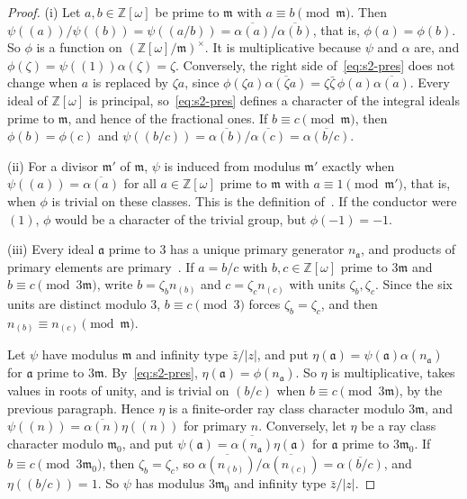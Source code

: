 \documentclass[11pt]{article}
\numberwithin{equation}{section}
\newcommand{\OO}{\mathbb Z[\omega]}
\begin{document}
\begin{proof}
(i) Let $a,b\in\OO$ be prime to $\mathfrak m$ with $a\equiv b\pmod{\mathfrak m}$. Then
$\psi((a))/\psi((b))=\psi((a/b))=\overline{\alpha(a)}/\overline{\alpha(b)}$, that is, $\phi(a)=\phi(b)$. So
$\phi$ is a function on $(\OO/\mathfrak m)^\times$. It is multiplicative because $\psi$ and $\alpha$ are, and
$\phi(\zeta)=\psi((1))\alpha(\zeta)=\zeta$. Conversely, the right side of~\eqref{eq:s2-pres} does not change
when $a$ is replaced by $\zeta a$, since $\phi(\zeta a)\overline{\alpha(\zeta a)}=\zeta\bar\zeta\,\phi(a)\overline{\alpha(a)}$.
Every ideal of $\OO$ is principal, so~\eqref{eq:s2-pres} defines a character of the integral ideals prime to
$\mathfrak m$, and hence of the fractional ones. If $b\equiv c\pmod{\mathfrak m}$, then $\phi(b)=\phi(c)$ and
$\psi((b/c))=\overline{\alpha(b)}/\overline{\alpha(c)}=\overline{\alpha(b/c)}$.

(ii) For a divisor $\mathfrak m'$ of $\mathfrak m$, $\psi$ is induced from modulus $\mathfrak m'$ exactly when
$\psi((a))=\overline{\alpha(a)}$ for all $a\in\OO$ prime to $\mathfrak m$ with $a\equiv1\pmod{\mathfrak m'}$, that
is, when $\phi$ is trivial on these classes. This is the definition of~\cite[Section~4.2]{QF}. If the
conductor were $(1)$, $\phi$ would be a character of the trivial group, but $\phi(-1)=-1$.

(iii) Every ideal $\mathfrak a$ prime to $3$ has a unique primary generator $n_{\mathfrak a}$, and products of
primary elements are primary~\cite[Section~2.7]{QF}. If $a=b/c$ with $b,c\in\OO$ prime to $3\mathfrak m$ and
$b\equiv c\pmod{3\mathfrak m}$, write $b=\zeta_bn_{(b)}$ and $c=\zeta_cn_{(c)}$ with units $\zeta_b,\zeta_c$. Since
the six units are distinct modulo $3$, $b\equiv c\pmod3$ forces $\zeta_b=\zeta_c$, and then
$n_{(b)}\equiv n_{(c)}\pmod{\mathfrak m}$.

Let $\psi$ have modulus $\mathfrak m$ and infinity type $\bar z/|z|$, and put $\eta(\mathfrak a)=\psi(\mathfrak a)\alpha(n_{\mathfrak a})$
for $\mathfrak a$ prime to $3\mathfrak m$. By~\eqref{eq:s2-pres}, $\eta(\mathfrak a)=\phi(n_{\mathfrak a})$. So
$\eta$ is multiplicative, takes values in roots of unity, and is trivial on $(b/c)$ when
$b\equiv c\pmod{3\mathfrak m}$, by the previous paragraph. Hence $\eta$ is a finite-order ray class character
modulo $3\mathfrak m$, and $\psi((n))=\overline{\alpha(n)}\eta((n))$ for primary $n$. Conversely, let $\eta$ be a
ray class character modulo $\mathfrak m_0$, and put $\psi(\mathfrak a)=\overline{\alpha(n_{\mathfrak a})}\eta(\mathfrak a)$
for $\mathfrak a$ prime to $3\mathfrak m_0$. If $b\equiv c\pmod{3\mathfrak m_0}$, then $\zeta_b=\zeta_c$, so
$\overline{\alpha(n_{(b)})}/\overline{\alpha(n_{(c)})}=\overline{\alpha(b/c)}$, and $\eta((b/c))=1$. So $\psi$ has
modulus $3\mathfrak m_0$ and infinity type $\bar z/|z|$.


\end{proof}
\end{document}
